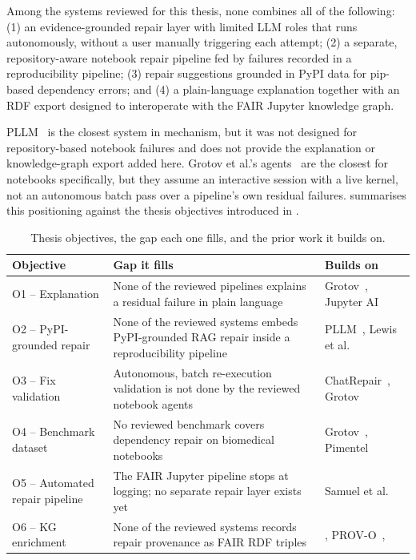 Among the systems reviewed for this thesis, none combines all of the
following: (1) an evidence-grounded repair layer with limited LLM roles that
runs autonomously, without a user manually triggering each attempt; (2) a
separate, repository-aware notebook repair pipeline fed by failures recorded
in a reproducibility pipeline; (3) repair suggestions grounded in PyPI data
for pip-based dependency errors; and (4) a plain-language explanation together
with an RDF export designed to interoperate with the FAIR Jupyter knowledge
graph.

PLLM~\cite{bartlett2025pllm} is the closest system in mechanism, but it was
not designed for repository-based notebook failures and does not provide the
explanation or knowledge-graph export added here. Grotov et al.'s agents~\cite{grotov2024untangling,
grotov2024debug} are the closest for notebooks specifically, but they assume
an interactive session with a live kernel, not an autonomous batch pass over
a pipeline's own residual failures.  summarises this
positioning against the thesis objectives introduced in
.

\begin{table}[htbp]
  \centering
  \begin{tabular}{|l|p{4.8cm}|p{4.0cm}|}
    \hline
    \textbf{Objective} & \textbf{Gap it fills} & \textbf{Builds on} \\
    \hline
    O1 -- Explanation & None of the reviewed pipelines explains a residual failure in plain language & Grotov~\cite{grotov2024untangling,grotov2024debug}, Jupyter AI~\cite{jupyterai2023} \\
    \hline
    O2 -- PyPI-grounded repair & None of the reviewed systems embeds PyPI-grounded RAG repair inside a reproducibility pipeline & PLLM~\cite{bartlett2025pllm}, Lewis et al.~\cite{lewis2020rag} \\
    \hline
    O3 -- Fix validation & Autonomous, batch re-execution validation is not done by the reviewed notebook agents & ChatRepair~\cite{xia2024chatrepair}, Grotov~\cite{grotov2024debug} \\
    \hline
    O4 -- Benchmark dataset & No reviewed benchmark covers dependency repair on biomedical notebooks & Grotov~\cite{grotov2024untangling}, Pimentel~\cite{pimentel2019msr} \\
    \hline
    O5 -- Automated repair pipeline & The FAIR Jupyter pipeline stops at logging; no separate repair layer exists yet & Samuel et al.~\cite{samuel2025docker,samuel2024gigascience,samuel2024fairkg} \\
    \hline
    O6 -- KG enrichment & None of the reviewed systems records repair provenance as FAIR RDF triples & \cite{samuel2024fairkg}, PROV-O~\cite{provenance2013}, \cite{wilkinson2016fair} \\
    \hline
  \end{tabular}
  \caption{Thesis objectives, the gap each one fills, and the prior work it builds on.}
  \label{tab:rw-gap}
\end{table}


